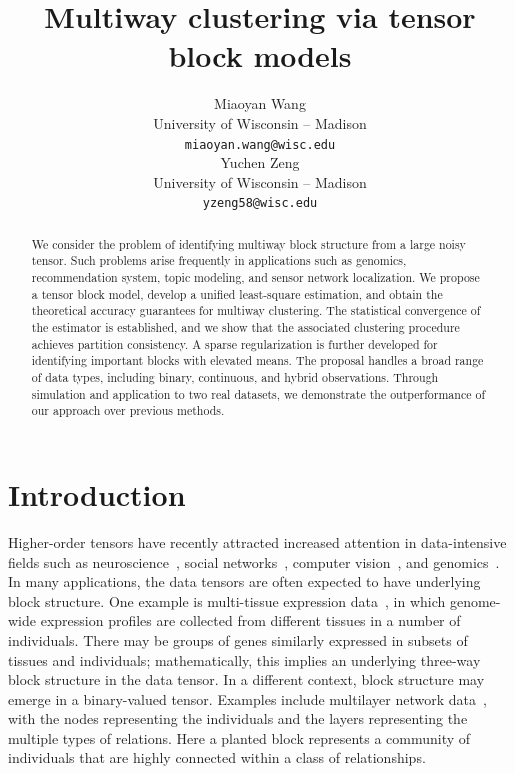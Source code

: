 \documentclass{article}
\title{Multiway clustering via tensor block models}
\author{%
Miaoyan Wang \\
 University of Wisconsin -- Madison\\
\texttt{miaoyan.wang@wisc.edu} \\
\And
Yuchen Zeng \\
 University of Wisconsin -- Madison\\
 \texttt{yzeng58@wisc.edu} \\
}
\begin{document}
\maketitle

\vspace{-.3cm}
\begin{abstract}
\vspace{-.2cm}

We consider the problem of identifying multiway block structure from a large noisy tensor. Such problems arise frequently in applications such as genomics, recommendation system, topic modeling, and sensor network localization. We propose a tensor block model, develop a unified least-square estimation, and obtain the theoretical accuracy guarantees for multiway clustering. The statistical convergence of the estimator is established, and we show that the associated clustering procedure achieves partition consistency. A sparse regularization is further developed for identifying important blocks with elevated means. The proposal handles a broad range of data types, including binary, continuous, and hybrid observations. Through simulation and application to two real datasets, we demonstrate the outperformance of our approach over previous methods. 
\end{abstract}

\section{Introduction}

Higher-order tensors have recently attracted increased attention in data-intensive fields such as neuroscience~\cite{zhou2013tensor}, social networks~\cite{nickel2011three}, computer vision~\cite{tang2013tensor}, and genomics~\cite{wang2017three,hore2016tensor}. In many applications, the data tensors are often expected to have underlying block structure. One example is multi-tissue expression data~\cite{wang2017three}, in which genome-wide expression profiles are collected from different tissues in a number of individuals. There may be groups of genes similarly expressed in subsets of tissues and individuals; mathematically, this implies an underlying three-way block structure in the data tensor. In a different context, block structure may emerge in a binary-valued tensor. Examples include multilayer network data~\cite{nickel2011three}, with the nodes representing the individuals and the layers representing the multiple types of relations. Here a planted block represents a community of individuals that are highly connected within a class of relationships. 
\end{document}
